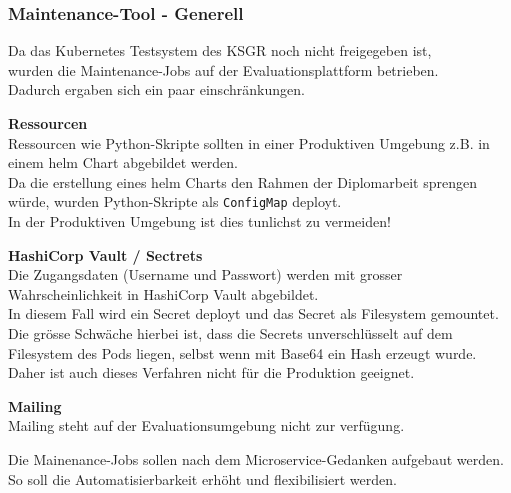 
\begin{flushleft}
    \subsubsection{Maintenance-Tool - Generell}
    Da das \Gls{Kubernetes} Testsystem des KSGR noch nicht freigegeben ist,\\
    wurden die Maintenance-Jobs auf der Evaluationsplattform betrieben.\\
    Dadurch ergaben sich ein paar einschränkungen.
    \begin{description}
        \item \textbf{Ressourcen}\hfill \\Ressourcen wie Python-Skripte sollten in einer Produktiven Umgebung z.B. in einem \Gls{helm} Chart abgebildet werden.\\Da die erstellung eines \gls{helm} Charts den Rahmen der Diplomarbeit sprengen würde, wurden Python-Skripte als \texttt{ConfigMap} deployt.\\In der Produktiven Umgebung ist dies tunlichst zu vermeiden!
        \item \textbf{HashiCorp Vault / Sectrets}\hfill \\Die Zugangsdaten (Username und Passwort) werden mit grosser Wahrscheinlichkeit in HashiCorp Vault\cite{ANQ2ENVU} abgebildet.\\In diesem Fall wird ein Secret deployt und das Secret als Filesystem gemountet.\\Die grösse Schwäche hierbei ist, dass die Secrets unverschlüsselt auf dem Filesystem des Pods liegen, selbst wenn mit Base64 ein Hash erzeugt wurde.\\Daher ist auch dieses Verfahren nicht für die Produktion geeignet.
        \item \textbf{Mailing}\hfill \\Mailing steht auf der Evaluationsumgebung nicht zur verfügung.
    \end{description}
\end{flushleft}
\begin{flushleft}
    Die Mainenance-Jobs sollen nach dem Microservice-Gedanken aufgebaut werden.\\
    So soll die Automatisierbarkeit erhöht und flexibilisiert werden.
\end{flushleft}